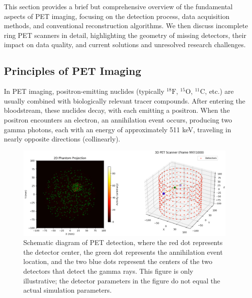 \documentclass[
reprint,
superscriptaddress,
nofootinbib,
amsmath,amssymb,
aps,
prd,
]{revtex4-2}
\begin{document}
This section provides a brief but comprehensive overview of the fundamental aspects of PET imaging, focusing on the detection process, data acquisition methods, and conventional reconstruction algorithms. We then discuss incomplete ring PET scanners in detail, highlighting the geometry of missing detectors, their impact on data quality, and current solutions and unresolved research challenges.

\subsection{Principles of PET Imaging}
In PET imaging, positron-emitting nuclides (typically $^{18}\text{F}$, $^{15}\text{O}$, $^{11}\text{C}$, etc.) are usually combined with biologically relevant tracer compounds. After entering the bloodstream, these nuclides decay, with each emitting a positron. When the positron encounters an electron, an annihilation event occurs, producing two gamma photons, each with an energy of approximately 511 keV, traveling in nearly opposite directions (collinearly).

\begin{figure}[htbp]
    \centering
    \vspace{-0.2cm}
    \includegraphics[width=0.98\textwidth]{Images/Screenshot2025-02-07214940}
    \vspace{-0.2cm}
    \caption{Schematic diagram of PET detection, where the red dot represents the detector center, the green dot represents the annihilation event location, and the two blue dots represent the centers of the two detectors that detect the gamma rays. This figure is only illustrative; the detector parameters in the figure do not equal the actual simulation parameters.}
    \vspace{-0.2cm}
    \label{fig:pet_event}
\end{figure}
\end{document}
